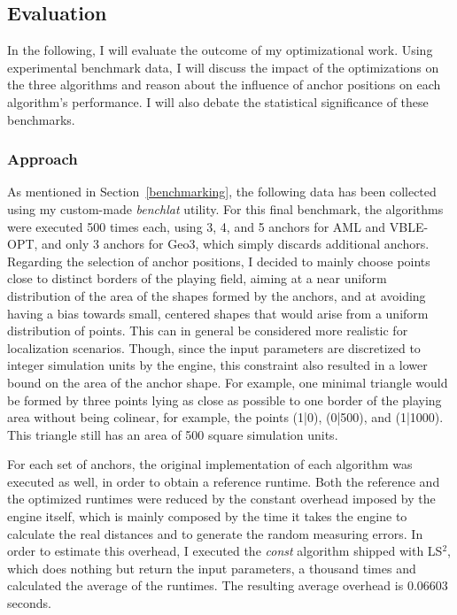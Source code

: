 \subsection{Evaluation}
\label{Evaluation}

In the following, I will evaluate the outcome of my optimizational work. Using experimental benchmark data, I will discuss the impact of the optimizations on the three algorithms and reason about the influence of anchor positions on each algorithm's performance. I will also debate the statistical significance of these benchmarks.

\subsubsection{Approach}
As mentioned in Section~\ref{benchmarking}, the following data has been collected using my custom-made \emph{benchlat} utility. For this final benchmark, the algorithms were executed 500 times each, using 3, 4, and 5 anchors for AML and VBLE-OPT, and only 3 anchors for Geo3, which simply discards additional anchors. Regarding the selection of anchor positions, I decided to mainly choose points close to distinct borders of the playing field, aiming at a near uniform distribution of the area of the shapes formed by the anchors, and at avoiding having a bias towards small, centered shapes that would arise from a uniform distribution of points. This can in general be considered more realistic for localization scenarios. Though, since the input parameters are discretized to integer simulation units by the engine, this constraint also resulted in a lower bound on the area of the anchor shape. For example, one minimal triangle would be formed by three points lying as close as possible to one border of the playing area without being colinear, for example, the points (1|0), (0|500), and (1|1000). This triangle still has an area of 500 square simulation units. 

For each set of anchors, the original implementation of each algorithm was executed as well, in order to obtain a reference runtime. Both the reference and the optimized runtimes were reduced by the constant overhead imposed by the engine itself, which is mainly composed by the time it takes the engine to calculate the real distances and to generate the random measuring errors. In order to estimate this overhead, I executed the \emph{const} algorithm shipped with LS$^{2}$, which does nothing but return the input parameters, a thousand times and calculated the average of the runtimes. The resulting average overhead is 0.06603 seconds. 

